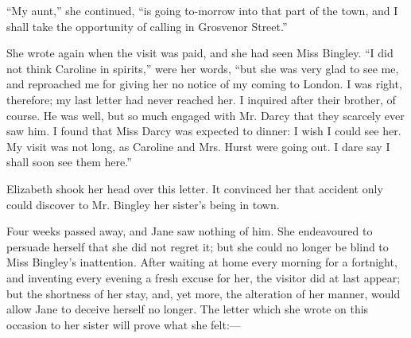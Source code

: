 \documentclass[12pt,openright]{book}
\begin{document}
“My aunt,” she continued, “is going to-morrow into that part of the town, and I shall take the opportunity of calling in Grosvenor Street.”

She wrote again when the visit was paid, and she had seen Miss Bingley. “I did not think Caroline in spirits,” were her words, “but she was very glad to see me, and reproached me for giving her no notice of my coming to London. I was right, therefore; my last letter had never reached her. I inquired after their brother, of course. He was well, but so much engaged with Mr. Darcy that they scarcely ever saw him. I found that Miss Darcy was expected to dinner: I wish I could see her. My visit was not long, as Caroline and Mrs. Hurst were going out. I dare say I shall soon see them here.”

Elizabeth shook her head over this letter. It convinced her that accident only could discover to Mr. Bingley her sister’s being in town.

Four weeks passed away, and Jane saw nothing of him. She endeavoured to persuade herself that she did not regret it; but she could no longer be blind to Miss Bingley’s inattention. After waiting at home every morning for a fortnight, and inventing every evening a fresh excuse for her, the visitor did at last appear; but the shortness of her stay, and, yet more, the alteration of her manner, would allow Jane to deceive herself no longer. The letter which she wrote on this occasion to her sister will prove what she felt:—
\end{document}
